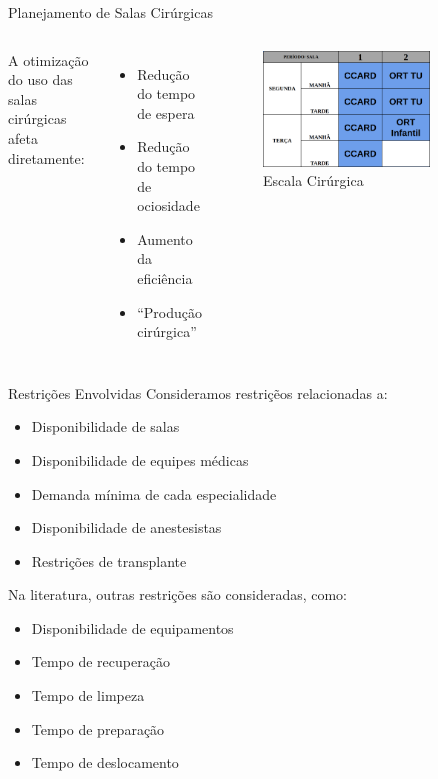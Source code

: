 \documentclass[10pt]{beamer}
\begin{document}
\begin{frame}{Planejamento de Salas Cirúrgicas}
    \begin{columns}
        A otimização do uso das salas cirúrgicas afeta diretamente:
        \begin{itemize}
            \setlength\itemsep{1em}
            \item Redução do tempo de espera
            \item Redução do tempo de ociosidade
            \item Aumento da eficiência
            \item ``Produção cirúrgica''
        \end{itemize}
        \begin{figure}
            \centering
            \includegraphics[width=0.8\textwidth]{images/schedule.png}
            \caption{Escala Cirúrgica}
        \end{figure}
    \end{columns}
\end{frame}


\begin{frame}{Restrições Envolvidas}
    Consideramos restriçẽos relacionadas a:
    \begin{itemize}
        \item Disponibilidade de salas
        \item Disponibilidade de equipes médicas
        \item Demanda mínima de cada especialidade
        \item \alert{Disponibilidade de anestesistas}
        \item \alert{Restrições de transplante}
    \end{itemize}

    Na literatura, outras restrições são consideradas, como:
    \begin{itemize}
        \item Disponibilidade de equipamentos
        \item Tempo de recuperação
        \item Tempo de limpeza
        \item Tempo de preparação
        \item Tempo de deslocamento
    \end{itemize}
\end{frame}
\end{document}
